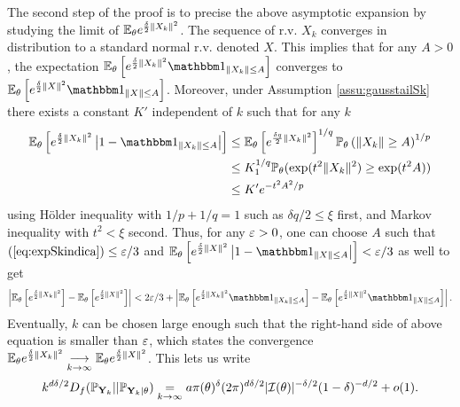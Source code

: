 \begin{proofb}
The second step of the proof is to precise the above asymptotic expansion by studying the limit of $\mathbb{E}_\theta e^{\frac{\delta}{2}\|X_k\|^2}$.
The sequence of r.v. $X_k$ converges in distribution to a standard normal r.v. denoted $X$. %
    This implies that for any $A>0$, the expectation $\EE_\theta\left[e^{\frac{\delta}{2}\|X_k\|^2}\indic_{\|X_k\|\leq A}\right]$ converges to $\EE_\theta\left[e^{\frac{\delta}{2}\|X\|^2}\indic_{\|X\|\leq A}\right]$. Moreover, under Assumption \ref{assu:gausstailSk} there exists a constant $K'$ independent of $k$ such that for any $k$
        \begin{align}\label{eq:expSkindica}
            \EE_\theta\left[ e^{\frac{\delta}{2}\|X_k\|^2}\left|1-\indic_{\|X_k\|\leq A}\right|\right] 
                & \leq \EE_\theta\left[e^{\frac{\delta q}{2}\|X_k\|^2}\right]^{1/q} \PP_\theta\left(\|X_k\|\geq A \right)^{1/p} \\
\nonumber            &\leq K_1^{1/q} \PP_\theta(\exp(t^2 \| X_k\|^2)\geq\exp(t^2A) )\\
\nonumber       & \leq K' e^{-t^2 A^2/p} 
        \end{align}
    using H\"older inequality with $1/p+1/q=1$ such as $\delta q/2\leq \xi $ first, and Markov inequality with $t^2<\xi$ second. Thus, for any $\varepsilon>0$, one can choose $A$ {such that $(\ref{eq:expSkindica}) \leq\varepsilon/3$ and $\EE_\theta\left[e^{\frac{\delta}{2}\|X\|^2}\left|1-\indic_{\|X\|\leq A}\right|\right]<\eps/3$ as well to get
    \begin{align}
       \left|\EE_\theta\left[e^{\frac{\delta}{2}\|X_k\|^2}\right] - \EE_\theta\left[e^{\frac{\delta}{2}\|X\|^2}\right]\right| 
     < 2\eps/3 + \left|\EE_\theta\left[e^{\frac{\delta}{2}\|X_k\|^2}\indic_{\|X_k\|\leq A}\right] - \EE_\theta\left[e^{\frac{\delta}{2}\|X\|^2}\indic_{\|X\|\leq A}\right]\right|.
    \end{align}
    Eventually, $k$ can be chosen large enough such that the right-hand side of above equation is smaller than $\varepsilon$, which states the convergence $\mathbb{E}_\theta e^{\frac{\delta}{2}\|X_k\|^2} \overset{\ }{\underset{k\rightarrow\infty}{\longrightarrow}} \mathbb{E}_\theta e^{\frac{\delta}{2}\|X\|^2}$.}
    This lets us write
    \begin{align}
        k^{d\delta/2} D_f(\mathbb{P}_{\mathbf{Y}_k} || \mathbb{P}_{\mathbf{Y}_k|\theta}) \overset{}{\underset{k\rightarrow\infty}{=}} a\pi(\theta)^\delta(2\pi)^{d\delta/2}|\mathcal{I}(\theta)|^{-\delta/2}(1-\delta)^{-d/2} + o(1).    
    \end{align}



\end{proofb}

